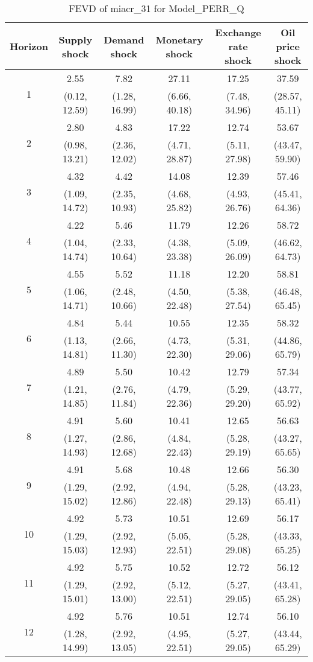\documentclass{article}
\begin{document}
\begin{table}
	\footnotesize
	\caption{FEVD of miacr_31 for Model_PERR_Q}
	\begin{tabular}{cccccc}
		Horizon & Supply shock & Demand shock & Monetary shock & Exchange rate shock & Oil price shock\\ \hline
		\multirow{2}{*}{1} & 2.55 & 7.82 & 27.11 & 17.25 & 37.59\\
		 & (0.12, 12.59) & (1.28, 16.99) & (6.66, 40.18) & (7.48, 34.96) & (28.57, 45.11)\\
		\multirow{2}{*}{2} & 2.80 & 4.83 & 17.22 & 12.74 & 53.67\\
		 & (0.98, 13.21) & (2.36, 12.02) & (4.71, 28.87) & (5.11, 27.98) & (43.47, 59.90)\\
		\multirow{2}{*}{3} & 4.32 & 4.42 & 14.08 & 12.39 & 57.46\\
		 & (1.09, 14.72) & (2.35, 10.93) & (4.68, 25.82) & (4.93, 26.76) & (45.41, 64.36)\\
		\multirow{2}{*}{4} & 4.22 & 5.46 & 11.79 & 12.26 & 58.72\\
		 & (1.04, 14.74) & (2.33, 10.64) & (4.38, 23.38) & (5.09, 26.09) & (46.62, 64.73)\\
		\multirow{2}{*}{5} & 4.55 & 5.52 & 11.18 & 12.20 & 58.81\\
		 & (1.06, 14.71) & (2.48, 10.66) & (4.50, 22.48) & (5.38, 27.54) & (46.48, 65.45)\\
		\multirow{2}{*}{6} & 4.84 & 5.44 & 10.55 & 12.35 & 58.32\\
		 & (1.13, 14.81) & (2.66, 11.30) & (4.73, 22.30) & (5.31, 29.06) & (44.86, 65.79)\\
		\multirow{2}{*}{7} & 4.89 & 5.50 & 10.42 & 12.79 & 57.34\\
		 & (1.21, 14.85) & (2.76, 11.84) & (4.79, 22.36) & (5.29, 29.20) & (43.77, 65.92)\\
		\multirow{2}{*}{8} & 4.91 & 5.60 & 10.41 & 12.65 & 56.63\\
		 & (1.27, 14.93) & (2.86, 12.68) & (4.84, 22.43) & (5.28, 29.19) & (43.27, 65.65)\\
		\multirow{2}{*}{9} & 4.91 & 5.68 & 10.48 & 12.66 & 56.30\\
		 & (1.29, 15.02) & (2.92, 12.86) & (4.94, 22.48) & (5.28, 29.13) & (43.23, 65.41)\\
		\multirow{2}{*}{10} & 4.92 & 5.73 & 10.51 & 12.69 & 56.17\\
		 & (1.29, 15.03) & (2.92, 12.93) & (5.05, 22.51) & (5.28, 29.08) & (43.33, 65.25)\\
		\multirow{2}{*}{11} & 4.92 & 5.75 & 10.52 & 12.72 & 56.12\\
		 & (1.29, 15.01) & (2.92, 13.00) & (5.12, 22.51) & (5.27, 29.05) & (43.41, 65.28)\\
		\multirow{2}{*}{12} & 4.92 & 5.76 & 10.51 & 12.74 & 56.10\\
		 & (1.28, 14.99) & (2.92, 13.05) & (4.95, 22.51) & (5.27, 29.05) & (43.44, 65.29)\\
	\end{tabular}
\label{tab:fevd-Model_PERR_Q-miacr_31}
\end{table}
\end{document}
